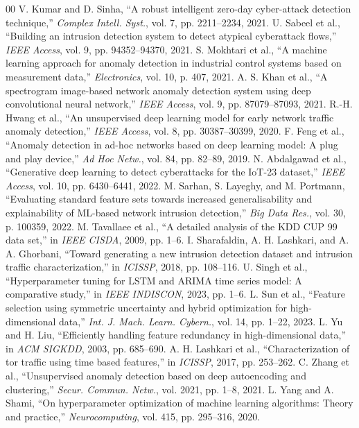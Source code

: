 \documentclass[twocolumn]{article}
\begin{document}
\begin{thebibliography}{00}
 V. Kumar and D. Sinha, ``A robust intelligent zero-day cyber-attack detection technique,'' \textit{Complex Intell. Syst.}, vol. 7, pp. 2211--2234, 2021.
 U. Sabeel et al., ``Building an intrusion detection system to detect atypical cyberattack flows,'' \textit{IEEE Access}, vol. 9, pp. 94352--94370, 2021.
 S. Mokhtari et al., ``A machine learning approach for anomaly detection in industrial control systems based on measurement data,'' \textit{Electronics}, vol. 10, p. 407, 2021.
 A. S. Khan et al., ``A spectrogram image-based network anomaly detection system using deep convolutional neural network,'' \textit{IEEE Access}, vol. 9, pp. 87079--87093, 2021.
 R.-H. Hwang et al., ``An unsupervised deep learning model for early network traffic anomaly detection,'' \textit{IEEE Access}, vol. 8, pp. 30387--30399, 2020.
 F. Feng et al., ``Anomaly detection in ad-hoc networks based on deep learning model: A plug and play device,'' \textit{Ad Hoc Netw.}, vol. 84, pp. 82--89, 2019.
 N. Abdalgawad et al., ``Generative deep learning to detect cyberattacks for the IoT-23 dataset,'' \textit{IEEE Access}, vol. 10, pp. 6430--6441, 2022.
 M. Sarhan, S. Layeghy, and M. Portmann, ``Evaluating standard feature sets towards increased generalisability and explainability of ML-based network intrusion detection,'' \textit{Big Data Res.}, vol. 30, p. 100359, 2022.
 M. Tavallaee et al., ``A detailed analysis of the KDD CUP 99 data set,'' in \textit{IEEE CISDA}, 2009, pp. 1--6.
 I. Sharafaldin, A. H. Lashkari, and A. A. Ghorbani, ``Toward generating a new intrusion detection dataset and intrusion traffic characterization,'' in \textit{ICISSP}, 2018, pp. 108--116.
 U. Singh et al., ``Hyperparameter tuning for LSTM and ARIMA time series model: A comparative study,'' in \textit{IEEE INDISCON}, 2023, pp. 1--6.
 L. Sun et al., ``Feature selection using symmetric uncertainty and hybrid optimization for high-dimensional data,'' \textit{Int. J. Mach. Learn. Cybern.}, vol. 14, pp. 1--22, 2023.
 L. Yu and H. Liu, ``Efficiently handling feature redundancy in high-dimensional data,'' in \textit{ACM SIGKDD}, 2003, pp. 685--690.
 A. H. Lashkari et al., ``Characterization of tor traffic using time based features,'' in \textit{ICISSP}, 2017, pp. 253--262.
 C. Zhang et al., ``Unsupervised anomaly detection based on deep autoencoding and clustering,'' \textit{Secur. Commun. Netw.}, vol. 2021, pp. 1--8, 2021.
 L. Yang and A. Shami, ``On hyperparameter optimization of machine learning algorithms: Theory and practice,'' \textit{Neurocomputing}, vol. 415, pp. 295--316, 2020.

\end{thebibliography}
\end{document}
